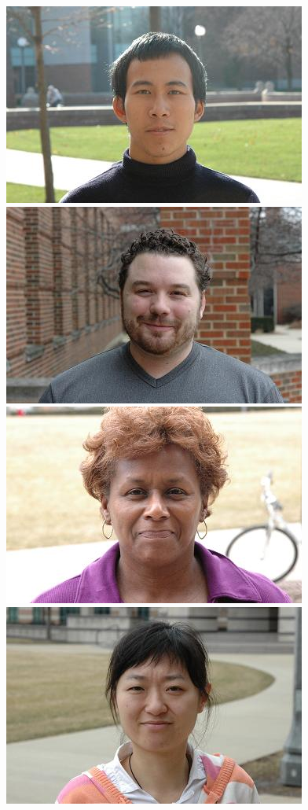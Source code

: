 \documentclass[10pt,journal,letterpaper,compsoc]{IEEEtran} %
\begin{document}
\begin{figure}
\includegraphics[scale=0.75,clip=true]{figures_pami/uiuc_example/normal_outdoor/DSC_1641.JPG}
\includegraphics[scale=0.75,clip=true]{figures_pami/uiuc_example/normal_outdoor/DSC_3522.JPG}
\includegraphics[scale=0.75,clip=true]{figures_pami/uiuc_example/normal_outdoor/DSC_3707.JPG}
\includegraphics[scale=0.75,clip=true]{figures_pami/uiuc_example/normal_outdoor/DSC_3772.JPG} \\

\end{figure}
\end{document}
